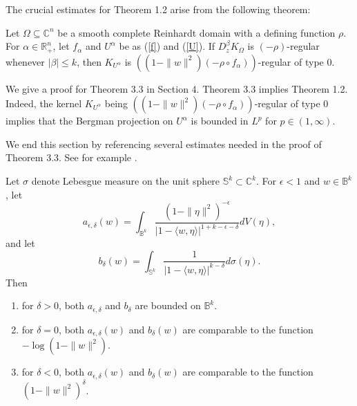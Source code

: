 \documentclass[reqno,12pt]{amsart}
\numberwithin{equation}{section}
\begin{document}
			The crucial estimates for Theorem 1.2 arise from the following theorem:
				\begin{thm}
					Let $\Omega\subseteq \mathbb C^n$ be a smooth {complete Reinhardt} domain with a defining function $\rho$. For $\alpha\in \mathbb R^n_+$, let $f_{\alpha}$ and $U^{\alpha}$  be as {(\ref{f}) and (\ref{U})}. If $D^{\beta}_zK_{\Omega}$ is $(-\rho)$-regular whenever $ |\beta|\leq k$,
					then $K_{U^{\alpha}}$ is $\left((1-\|w\|^2)(-\rho\circ f_\alpha)\right)$-regular of type $0$.
				\end{thm}
				{We give a proof for Theorem 3.3 in Section 4.  Theorem 3.3  implies Theorem 1.2. Indeed, the kernel $K_{U^{\alpha}}$ being $\left((1-\|w\|^2)(-\rho\circ f_\alpha)\right)$-regular of type $0$ implies that the Bergman projection on $U^{\alpha}$ is bounded in $L^p$ for $p\in (1,\infty)$. }
				
			We end this section by referencing several estimates needed in the proof of Theorem 3.3. See for example \cite{Zhu}.
			\begin{lem}Let $\sigma$ denote Lebesgue measure on the unit sphere $\mathbb S^k\subset\mathbb C^k$.
				For $\epsilon<1$ and $w\in\mathbb B^k$, let 
				\begin{equation}\label{**}
				a_{\epsilon,\delta}(w)=\int_{\mathbb B^k}\frac{(1-\|\eta\|^2)^{-\epsilon}}{|1-\langle w,\eta\rangle |^{1+k-\epsilon-\delta}}dV(\eta),
				\end{equation}
				and let
				\begin{equation}\label{ }
				b_\delta(w)=\int_{\mathbb S^k}\frac{1}{|1-\langle w,\eta\rangle |^{k-\delta}}d\sigma(\eta).
				\end{equation}
				Then \begin{enumerate}
					\item for $\delta>0$, both $a_{\epsilon,\delta}$ and $b_{\delta}$ are bounded on $\mathbb B^k$.
					\item for $\delta=0$, both $a_{\epsilon,\delta}(w)$ and $b_{\delta}(w)$ are comparable to the function $-\log(1-\|w\|^2)$.
					\item for $\delta<0$, both $a_{\epsilon,\delta}(w)$ and $b_{\delta}(w)$ are comparable to the function $(1-\|w\|^2)^{\delta}$.
				\end{enumerate}
			\end{lem}
			
			
\end{document}
